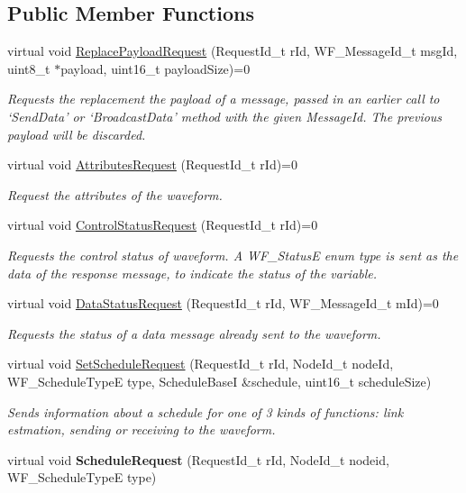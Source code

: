 \subsection*{Public Member Functions}
\begin{DoxyCompactItemize}
\item 
virtual void \hyperlink{class_waveform_1_1_waveform_base_a67053c3a29b7fa3f477dce71a15fc624}{Replace\+Payload\+Request} (Request\+Id\+\_\+t r\+Id, W\+F\+\_\+\+Message\+Id\+\_\+t msg\+Id, uint8\+\_\+t $\ast$payload, uint16\+\_\+t payload\+Size)=0
\begin{DoxyCompactList}\small\item\em Requests the replacement the payload of a message, passed in an earlier call to ‘\+Send\+Data’ or ‘\+Broadcast\+Data’ method with the given Message\+Id. The previous payload will be discarded. \end{DoxyCompactList}\item 
virtual void \hyperlink{class_waveform_1_1_waveform_base_aad9cfbc04a5168caa1780edd812d6f7d}{Attributes\+Request} (Request\+Id\+\_\+t r\+Id)=0
\begin{DoxyCompactList}\small\item\em Request the attributes of the waveform. \end{DoxyCompactList}\item 
virtual void \hyperlink{class_waveform_1_1_waveform_base_ac5a64312ea70923af969c51cc4e0363d}{Control\+Status\+Request} (Request\+Id\+\_\+t r\+Id)=0
\begin{DoxyCompactList}\small\item\em Requests the control status of waveform. A W\+F\+\_\+\+StatusE enum type is sent as the data of the response message, to indicate the status of the variable. \end{DoxyCompactList}\item 
virtual void \hyperlink{class_waveform_1_1_waveform_base_a767db0e1d92d0e3ae46da3b2335e9b87}{Data\+Status\+Request} (Request\+Id\+\_\+t r\+Id, W\+F\+\_\+\+Message\+Id\+\_\+t m\+Id)=0
\begin{DoxyCompactList}\small\item\em Requests the status of a data message already sent to the waveform. \end{DoxyCompactList}\item 
virtual void \hyperlink{class_waveform_1_1_waveform_base_ad0e6f375f176315332c7e90d57fb8a21}{Set\+Schedule\+Request} (Request\+Id\+\_\+t r\+Id, Node\+Id\+\_\+t node\+Id, W\+F\+\_\+\+Schedule\+TypeE type, Schedule\+BaseI \&schedule, uint16\+\_\+t schedule\+Size)
\begin{DoxyCompactList}\small\item\em Sends information about a schedule for one of 3 kinds of functions\+: link estmation, sending or receiving to the waveform. \end{DoxyCompactList}\item 
virtual void {\bfseries Schedule\+Request} (Request\+Id\+\_\+t r\+Id, Node\+Id\+\_\+t nodeid, W\+F\+\_\+\+Schedule\+TypeE type)\hypertarget{class_waveform_1_1_waveform_base_ac443d02d12315ac2aeb4cb0f62c35862}{}\label{class_waveform_1_1_waveform_base_ac443d02d12315ac2aeb4cb0f62c35862}


\end{DoxyCompactItemize}
